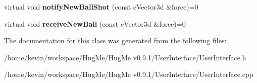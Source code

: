 \begin{DoxyCompactItemize}
\item 
\hypertarget{classUserInterface_aa2084b47ac3d2f6dea1414a63b5abc7d}{
virtual void {\bfseries notifyNewBallShot} (const cVector3d \&force)=0}
\label{classUserInterface_aa2084b47ac3d2f6dea1414a63b5abc7d}

\item 
\hypertarget{classUserInterface_a82f8b682701aa8ba1dedae0886fa27b9}{
virtual void {\bfseries receiveNewBall} (const cVector3d \&force)=0}
\label{classUserInterface_a82f8b682701aa8ba1dedae0886fa27b9}

\end{DoxyCompactItemize}


The documentation for this class was generated from the following files:\begin{DoxyCompactItemize}
\item 
/home/kevin/workspace/HugMe/HugMe v0.9.1/UserInterface/UserInterface.h\item 
/home/kevin/workspace/HugMe/HugMe v0.9.1/UserInterface/UserInterface.cpp\end{DoxyCompactItemize}
